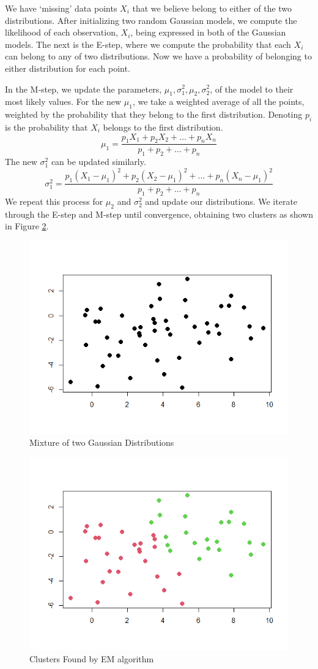 \documentclass[11pt]{article}
\begin{document}
We have `missing' data points $X_i$ that we believe belong to either of the two distributions. After initializing two random Gaussian models, we compute the likelihood of each observation, $X_i$, being expressed in both of the Gaussian models. The next is the E-step, where we compute the probability that each $X_i$ can belong to any of two distributions. Now we have a probability of belonging to either distribution for each point. 

In the M-step, we update the parameters, $\mu_1,\sigma^2_1, \mu_2,\sigma^2_2$, of the model to their most likely values. For the new $\mu_1$, we take a weighted average of all the points, weighted by the probability that they belong to the first distribution. Denoting $p_i$ is the probability that $X_i$ belongs to the first distribution. 
\[\mu_1=\frac{p_1X_1+p_2X_2+\dots+p_nX_n}{p_1+p_2+\dots+p_n}\]
The new $\sigma^2_1$ can be updated similarly. 
\[\sigma^2_1=\frac{p_1(X_1-\mu_1)^2+p_2(X_2-\mu_1)^2+\dots+p_n(X_n-\mu_1)^2}{p_1+p_2+\dots+p_n}\]
We repeat this process for $\mu_2$ and $\sigma^2_2$ and update our distributions. We iterate through the E-step and M-step until convergence, obtaining two clusters as shown in Figure \ref{fig:clustering2}. 




\begin{figure}[H]
    \centering
    \includegraphics[width = 10 cm]{nocolor.png}
    \caption{Mixture of two Gaussian Distributions}
    \label{fig:clustering1}
\end{figure}


\begin{figure}[H]
    \centering
    \includegraphics[width = 10 cm]{clustering.png}
    \caption{Clusters Found by EM algorithm}
    \label{fig:clustering2}
\end{figure}
\end{document}
